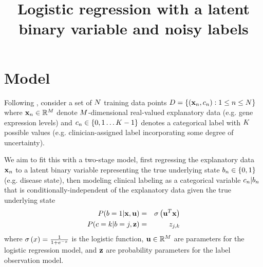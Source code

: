 \documentclass{article}
\begin{document}

\title{Logistic regression with a latent binary variable and noisy labels}

\maketitle

\section{Model}

Following \cite{BootkrajangKaban2012},
consider a set of $N$ training data points
$D = \left\{ ({\bf x}_{n},c_{n}): 1 \leq n \leq N \right\}$
where
${\bf x}_n \in \mathbb{R}^M$
denote $M$-dimensional real-valued explanatory data (e.g. gene expression levels)
and
$c_n \in \left\{ 0, 1 \ldots K - 1 \right\}$
denotes a categorical label with $K$ possible values
(e.g. clinician-assigned label incorporating some degree of uncertainty).

We aim to fit this with a two-stage model,
first regressing the explanatory data ${\bf x}_n$ to a latent binary variable representing the true underlying state
$b_n \in \left\{ 0, 1 \right\}$
(e.g. disease state),
then modeling clinical labeling as a categorical variable $c_n | b_n$
that is conditionally-independent of the explanatory data given the true underlying state
\begin{eqnarray*}
P(b = 1 | {\bf x}, {\bf u}) & = & \sigma\left({\bf u}^T {\bf x}\right) \\
P(c = k | b = j, {\bf z}) & = & z_{j,k}
\end{eqnarray*}
where
$\sigma\left(x\right) = \frac{1}{1+e^{-x}}$ is the logistic function,
${\bf u} \in \mathbb{R}^M$ are parameters for the logistic regression model, and
${\bf z}$ are probability parameters for the label observation model.
\end{document}
